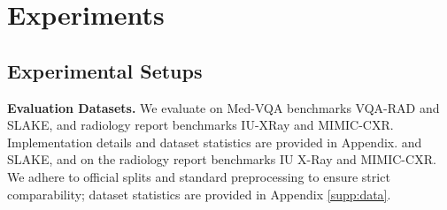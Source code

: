 \section{Experiments}
\label{sec:exp}

\subsection{Experimental Setups}
\noindent\textbf{Evaluation Datasets.}
We evaluate on Med-VQA benchmarks VQA-RAD and SLAKE, and radiology report benchmarks IU-XRay and MIMIC-CXR. Implementation details and dataset statistics are provided in Appendix.\cite{lau2018dataset} and SLAKE\cite{liu2021slake}, and on the radiology report benchmarks IU X-Ray\cite{demner2015preparing} and MIMIC-CXR\cite{johnson2019mimic}. We adhere to official splits and standard preprocessing to ensure strict comparability; dataset statistics are provided in Appendix \ref{supp:data}.

